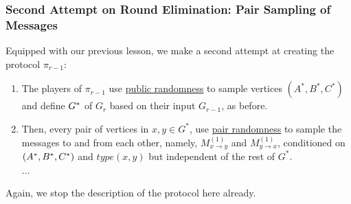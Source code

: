 \documentclass[11pt]{article}
\theoremstyle{definition}
\newenvironment{tbox}{\begin{tcolorbox}[
		enlarge top by=5pt,
		enlarge bottom by=5pt,
		 breakable,
		 boxsep=0pt,
                  left=4pt,
                  right=4pt,
                  top=10pt,
                  arc=4pt,
                  boxrule=1pt,toprule=1pt,
                  colback=white
                  ]%
	}
{\end{tcolorbox}}
\newcommand{\prot}{\ensuremath{\pi}}
\begin{document}
\subsubsection{Second Attempt on Round Elimination: Pair Sampling of Messages}\label{sec:attempt2}
Equipped with our previous lesson, we make a second attempt at creating the protocol $\prot_{r-1}$:
\begin{tbox}
	\begin{enumerate}
		\item The players of $\prot_{r-1}$ use \underline{public randomness} to sample vertices $(A^*,B^*,C^*)$ and define $G^*$ of $G_r$ based on their input $G_{r-1}$, as before. 
		
		\item Then, every pair of vertices in $x,y \in G^*$, use \underline{pair randomness} to sample the messages to and from each other, namely, $M^{(1)}_{x \rightarrow y}$ and $M^{(1)}_{y \rightarrow x}$, 
		conditioned on $(A^*,B^*,C^*)$ and $type(x,y)$ but independent of the rest of $G^*$. 
		\\
		...
	\end{enumerate}
	Again, we stop the description of the protocol here already. 
\end{tbox}
\end{document}
